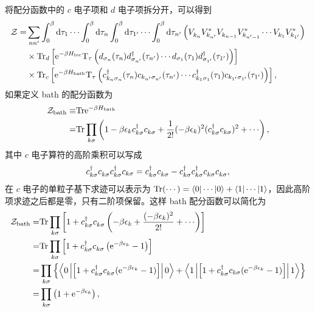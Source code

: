 将配分函数中的 $c$ 电子项和 $d$ 电子项拆分开，可以得到 
\begin{equation}
    \begin{aligned}
        \mathcal{Z}=&\sum_{nn'}\int_0^\beta \mathrm{d}\tau_1\cdots \int_0^\beta \mathrm{d}\tau_n \int_0^\beta\mathrm{d}\tau_{1'}\cdots \int_0^\beta \mathrm{d}\tau_{n'}\left( V_{k_n}^{ }V_{k_{n'}}^* V_{k_{n-1}}^{ }V_{k_{n'-1}}^*\cdots V_{k_1}^{ }V_{k_{1'}}^*\right)\\
        & \times\mathrm{Tr}_d\left[ \mathrm{e}^{-\beta H_{\mathrm{loc}}}\mathrm{T}_\tau \left( d_{\sigma_n}(\tau_n)d_{\sigma_{n'}}^\dagger (\tau_{n'})\cdots d_{\sigma_1}(\tau_1)d_{\sigma_{1'}}^\dagger(\tau_{1'}) \right) \right]\\
        &\times \mathrm{Tr}_c\left[ \mathrm{e}^{-\beta H_{\mathrm{bath}}}\mathrm{T}_\tau \left( c_{k_n\sigma_n}^\dagger (\tau_n) c_{k_{n'}\sigma_{n'}}(\tau_{n'})\cdots c_{k_1\sigma_1}^\dagger (\tau_1)c_{k_{1'}\sigma_{1'}}(\tau_{1'}) \right) \right],
    \end{aligned}
\end{equation}
如果定义 bath 的配分函数为 
\begin{equation}
    \begin{aligned}
        \mathcal{Z}_{\fun{bath}}\equiv &\fun{Tr}\e^{-\beta H_{\fun{bath}}}\\
        =&\fun{Tr}\prod_{k\sigma}\ls 1-\beta\epsilon_kc_{k\sigma}^\dg c_{k\sigma}^{ }+\frac{1}{2!}(-\beta\epsilon_k)^2(c_{k\sigma}^\dg c_{k\sigma}^{ })^2+\cdots \rs,
    \end{aligned}
\end{equation}
其中 $c$ 电子算符的高阶乘积可以写成 
\begin{equation}
    c_{k\sigma}^\dagger c_{k\sigma}^{ }c_{k\sigma}^\dagger c_{k\sigma}=c_{k\sigma}^\dagger c_{k\sigma}^{ }-c_{k\sigma}^{\dagger} c_{k\sigma}^\dagger c_{k\sigma}^{ }c_{k\sigma}^{ },
\end{equation}
在 $c$ 电子的单粒子基下求迹可以表示为 $\mathrm{Tr}(\cdots)=\langle 0|\cdots|0\rangle +\langle 1|\cdots |1\rangle$，因此高阶项求迹之后都是零，只有二阶项保留。这样 bath 配分函数可以简化为 
\begin{equation}
    \begin{aligned}
        \mathcal{Z}_{\fun{bath}}=& \fun{Tr}\prod_{k\sigma}\lmi 1+c_{k\sigma}^\dg c_{k\sigma}^{ }\ls -\beta \epsilon_k+\frac{(-\beta\epsilon_k)^2}{2!}+\cdots \rs \rmi\\
        =& \fun{Tr}\prod_{k\sigma}\lmi 1+c_{k\sigma}^\dg c_{k\sigma}^{ }\ls \e^{-\beta\epsilon_k}-1 \rs \rmi\\
        =&\prod_{k\sigma}\lb \llag 0\left| \lmi 1+c_{k\sigma}^\dg c_{k\sigma}^{ }(\e^{-\beta\epsilon_k}-1) \rmi \right| 0 \rrag + \llag 1 \left| \lmi 1+c_{k\sigma}^\dg c_{k\sigma}(\e^{-\beta\epsilon_k}-1) \rmi \right| 1 \rrag \rb\\
        =& \prod_{k\sigma}\ls 1+\e^{-\beta \epsilon_k} \rs,
    \end{aligned}
\end{equation}
